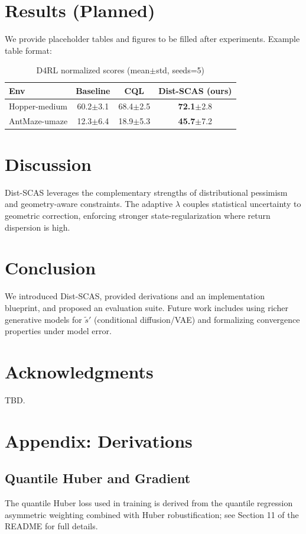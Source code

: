\documentclass{article}
\begin{document}
\section{Results (Planned)}
We provide placeholder tables and figures to be filled after experiments. Example table format:
\begin{table}[h]
\centering
\caption{D4RL normalized scores (mean$\pm$std, seeds=5)}
\begin{tabular}{lccc}
\toprule
Env & Baseline & CQL & Dist-SCAS (ours) \\
\midrule
Hopper-medium & 60.2$\pm$3.1 & 68.4$\pm$2.5 & \textbf{72.1}$\pm$2.8 \\
AntMaze-umaze & 12.3$\pm$6.4 & 18.9$\pm$5.3 & \textbf{45.7}$\pm$7.2 \\
\bottomrule
\end{tabular}
\end{table}

\section{Discussion}
Dist-SCAS leverages the complementary strengths of distributional pessimism and geometry-aware constraints. The adaptive $\lambda$ couples statistical uncertainty to geometric correction, enforcing stronger state-regularization where return dispersion is high.

\section{Conclusion}
We introduced Dist-SCAS, provided derivations and an implementation blueprint, and proposed an evaluation suite. Future work includes using richer generative models for $\tilde s'$ (conditional diffusion/VAE) and formalizing convergence properties under model error.

\section*{Acknowledgments}
TBD.

\appendix
\section{Appendix: Derivations}
\subsection{Quantile Huber and Gradient}
The quantile Huber loss used in training is derived from the quantile regression asymmetric weighting combined with Huber robustification; see Section 11 of the README for full details.
\end{document}
